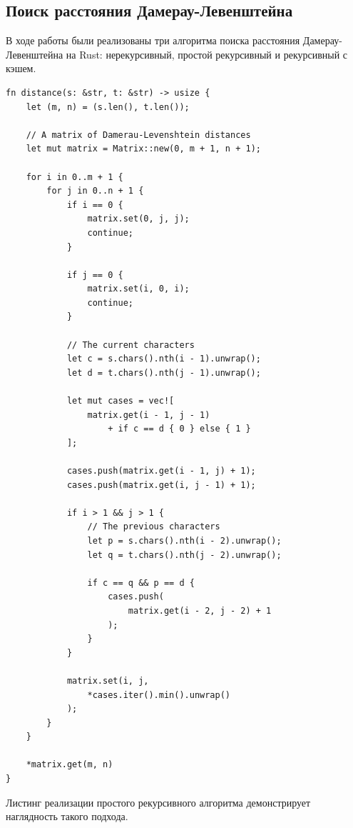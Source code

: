 \documentclass{report}
\begin{document}
\subsection{Поиск расстояния Дамерау-Левенштейна}

В ходе работы были реализованы три алгоритма поиска расстояния
Дамерау-Левенштейна на Rust: нерекурсивный, простой рекурсивный и
рекурсивный с кэшем.

\begin{lstlisting}[caption=Реализация нерекурсивного алгоритма]
fn distance(s: &str, t: &str) -> usize {
    let (m, n) = (s.len(), t.len());

    // A matrix of Damerau-Levenshtein distances
    let mut matrix = Matrix::new(0, m + 1, n + 1);

    for i in 0..m + 1 {
        for j in 0..n + 1 {
            if i == 0 {
                matrix.set(0, j, j);
                continue;
            }

            if j == 0 {
                matrix.set(i, 0, i);
                continue;
            }

            // The current characters
            let c = s.chars().nth(i - 1).unwrap();
            let d = t.chars().nth(j - 1).unwrap();

            let mut cases = vec![
                matrix.get(i - 1, j - 1)
                    + if c == d { 0 } else { 1 }
            ];

            cases.push(matrix.get(i - 1, j) + 1);
            cases.push(matrix.get(i, j - 1) + 1);

            if i > 1 && j > 1 {
                // The previous characters
                let p = s.chars().nth(i - 2).unwrap();
                let q = t.chars().nth(j - 2).unwrap();

                if c == q && p == d {
                    cases.push(
                        matrix.get(i - 2, j - 2) + 1
                    );
                }
            }

            matrix.set(i, j,
                *cases.iter().min().unwrap()
            );
        }
    }

    *matrix.get(m, n)
}
\end{lstlisting}

Листинг реализации простого рекурсивного алгоритма демонстрирует
наглядность такого подхода.
\end{document}
